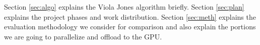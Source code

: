 Section \ref{sec:algo} explains the Viola Jones algorithm briefly. Section \ref{sec:plan} explains the project phases and work distribution. Section \ref{sec:meth} explains the evaluation  methodology we consider for comparison and also explain the portions we are going to parallelize and offload to the GPU.


